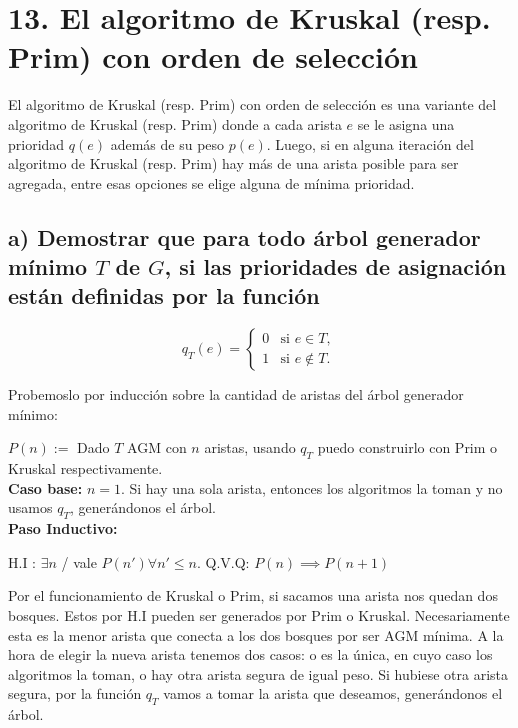 \documentclass{article}
\begin{document}
\author{Daniel Bustos}
\maketitle
\section*{13. El algoritmo de Kruskal (resp. Prim) con orden de selección}

El algoritmo de Kruskal (resp. Prim) con orden de selección es una variante del algoritmo de Kruskal (resp. Prim) donde a cada arista $e$ se le asigna una prioridad $q(e)$ además de su peso $p(e)$. Luego, si en alguna iteración del algoritmo de Kruskal (resp. Prim) hay más de una arista posible para ser agregada, entre esas opciones se elige alguna de mínima prioridad.

\subsection*{a) Demostrar que para todo árbol generador mínimo $T$ de $G$, si las prioridades de asignación están definidas por la función}

\[
q_T(e) = \begin{cases}
    0 & \text{si } e \in T, \\
    1 & \text{si } e \notin T.
\end{cases}
\]

Probemoslo por inducción sobre la cantidad de aristas del árbol generador mínimo:

$P(n) :=$ Dado $T$ AGM con $n$ aristas, usando $q_T$ puedo construirlo con Prim o Kruskal respectivamente.\\

\textbf{Caso base:} $n = 1$. Si hay una sola arista, entonces los algoritmos la toman y no usamos $q_T$, generándonos el árbol.\\

\textbf{Paso Inductivo:}

H.I : $\exists n$ / vale $P(n') \forall n' \leq n$. Q.V.Q: $P(n) \implies P(n+1)$

Por el funcionamiento de Kruskal o Prim, si sacamos una arista nos quedan dos bosques. Estos por H.I pueden ser generados por Prim o Kruskal. Necesariamente esta es la menor arista que conecta a los dos bosques por ser AGM mínima. A la hora de elegir la nueva arista tenemos dos casos: o es la única, en cuyo caso los algoritmos la toman, o hay otra arista segura de igual peso. Si hubiese otra arista segura, por la función $q_T$ vamos a tomar la arista que deseamos, generándonos el árbol.
\end{document}
